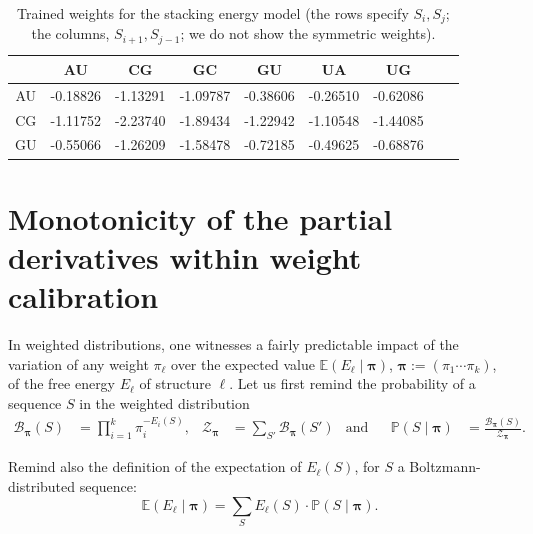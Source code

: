 \documentclass[10pt]{article}
\newcommand{\partfun}[1]{\mathcal{Z}_{#1}}
\begin{document}
\begin{table}[b]
  \centering
  \caption{Trained weights for the stacking energy model (the rows specify $S_i,S_j$; the columns, $S_{i+1},S_{j-1}$; we do not show the symmetric weights).}
  \label{tab:stackingmodel}
  \begin{tabular}{c@{\quad}|@{\quad}c@{\quad}c@{\quad}c@{\quad}c@{\quad}c@{\quad}c@{\quad}c@{\quad}c}
       & AU & CG & GC & GU & UA & UG \\\hline
    AU &
-0.18826 &
-1.13291 &
-1.09787 &
-0.38606 &
-0.26510 &
-0.62086
    \\
    CG &
-1.11752 &
-2.23740 &
-1.89434 &
-1.22942 &
-1.10548 &
-1.44085
    \\
    GU &
-0.55066 &
-1.26209 &
-1.58478 &
-0.72185 &
-0.49625 &
-0.68876
    \\
  \end{tabular}
\end{table}

\section{Monotonicity of the partial derivatives within weight calibration}
\label{sec:weight_derivatives}
%
In weighted distributions, one witnesses a fairly predictable impact of the variation of any weight $\pi_\ell$ over the expected value $\mathbb{E}(E_\ell\mid \pmb{\pi})$, $\pmb{\pi}:= (\pi_1\cdots\pi_k)$, of the free energy $E_\ell$ of structure $\ell$.  Let us  first remind the probability of a sequence $S$ in the weighted distribution
\begin{align*}
  \mathcal{B}_{\pmb{\pi}}(S) &= \prod_{i=1}^{k} \pi_i^{-E_i(S)}, &
  \partfun{\pmb{\pi}}&=\sum_{S'}\mathcal{B}_{\pmb{\pi}}(S') &
    \text{and}& &
  \mathbb{P}(S\mid \pmb{\pi}) &= \frac{\mathcal{B}_{\pmb{\pi}}(S)}{\partfun{\pmb{\pi}}}.
  \end{align*}

Remind also the definition of the expectation of $E_\ell(S)$, for $S$ a Boltzmann-distributed sequence:
$$\mathbb{E}(E_\ell\mid \pmb{\pi}) = \sum_S E_\ell(S)\cdot \mathbb{P}(S\mid \pmb{\pi}).$$
\end{document}
